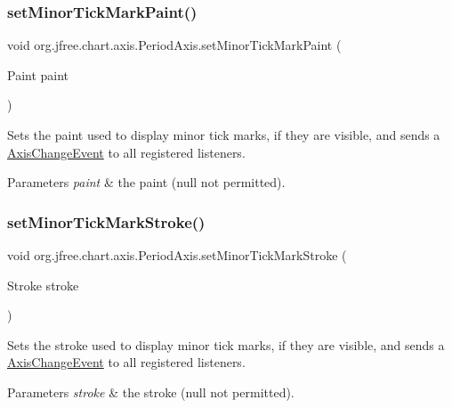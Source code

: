 \subsubsection{\texorpdfstring{set\+Minor\+Tick\+Mark\+Paint()}{setMinorTickMarkPaint()}}
{\footnotesize\ttfamily void org.\+jfree.\+chart.\+axis.\+Period\+Axis.\+set\+Minor\+Tick\+Mark\+Paint (\begin{DoxyParamCaption}\item[{Paint}]{paint }\end{DoxyParamCaption})}

Sets the paint used to display minor tick marks, if they are visible, and sends a \mbox{\hyperlink{}{Axis\+Change\+Event}} to all registered listeners.


\begin{DoxyParams}{Parameters}
{\em paint} & the paint ({\ttfamily null} not permitted). \\
\hline
\end{DoxyParams}
\mbox{\label{classorg_1_1jfree_1_1chart_1_1axis_1_1_period_axis_abb0b6e3b8ca6500fb4315224265c6298}} 
\subsubsection{\texorpdfstring{set\+Minor\+Tick\+Mark\+Stroke()}{setMinorTickMarkStroke()}}
{\footnotesize\ttfamily void org.\+jfree.\+chart.\+axis.\+Period\+Axis.\+set\+Minor\+Tick\+Mark\+Stroke (\begin{DoxyParamCaption}\item[{Stroke}]{stroke }\end{DoxyParamCaption})}

Sets the stroke used to display minor tick marks, if they are visible, and sends a \mbox{\hyperlink{}{Axis\+Change\+Event}} to all registered listeners.


\begin{DoxyParams}{Parameters}
{\em stroke} & the stroke ({\ttfamily null} not permitted). \\
\hline
\end{DoxyParams}
\mbox{\label{classorg_1_1jfree_1_1chart_1_1axis_1_1_period_axis_aad81a1dcb543fc4369dc23a7cecc10d8}} 
